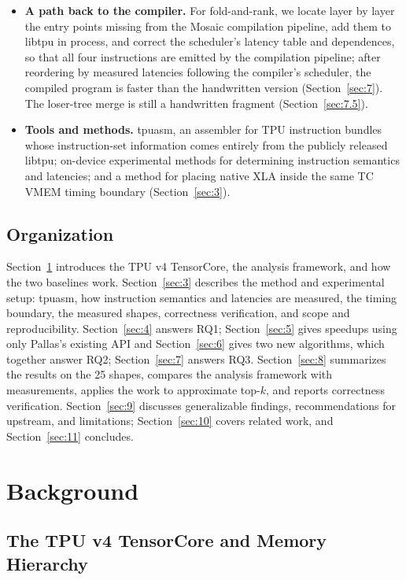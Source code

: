\documentclass[sigconf,nonacm,balance=false]{acmart}
\begin{document}
\begin{itemize}
\item \textbf{A path back to the compiler.} For fold-and-rank, we locate layer by layer the entry points missing from the Mosaic compilation pipeline, add them to libtpu in process, and correct the scheduler's latency table and dependences, so that all four instructions are emitted by the compilation pipeline; after reordering by measured latencies following the compiler's scheduler, the compiled program is faster than the handwritten version (Section~\ref{sec:7}). The loser-tree merge is still a handwritten fragment (Section~\ref{sec:7.5}).
\item \textbf{Tools and methods.} tpuasm, an assembler for TPU instruction bundles whose instruction-set information comes entirely from the publicly released libtpu; on-device experimental methods for determining instruction semantics and latencies; and a method for placing native XLA inside the same TC VMEM timing boundary (Section~\ref{sec:3}).
\end{itemize}

\subsection{Organization}
\label{sec:1.5}

Section~\ref{sec:2} introduces the TPU v4 TensorCore, the analysis framework, and how the two baselines work. Section~\ref{sec:3} describes the method and experimental setup: tpuasm, how instruction semantics and latencies are measured, the timing boundary, the measured shapes, correctness verification, and scope and reproducibility. Section~\ref{sec:4} answers RQ1; Section~\ref{sec:5} gives speedups using only Pallas's existing API and Section~\ref{sec:6} gives two new algorithms, which together answer RQ2; Section~\ref{sec:7} answers RQ3. Section~\ref{sec:8} summarizes the results on the 25 shapes, compares the analysis framework with measurements, applies the work to approximate top-$k$, and reports correctness verification. Section~\ref{sec:9} discusses generalizable findings, recommendations for upstream, and limitations; Section~\ref{sec:10} covers related work, and Section~\ref{sec:11} concludes.

\section{Background}
\label{sec:2}

\subsection{The TPU v4 TensorCore and Memory Hierarchy}
\label{sec:2.1}
\end{document}
